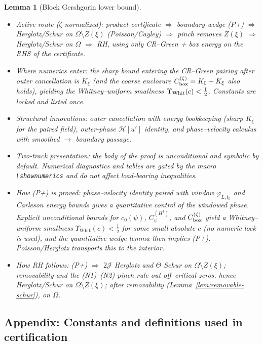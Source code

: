 \documentclass[11pt]{article}
\newcommand{\Hilb}{\mathcal H}
\newtheorem{lemma}{Lemma}[section]
\theoremstyle{definition}
\theoremstyle{remark}
\begin{document}
\begin{lemma}[Block Gershgorin lower bound]
\begin{itemize}
\item Active route ($\zeta$-normalized): product certificate $\Rightarrow$ boundary wedge (P+) $\Rightarrow$ Herglotz/Schur on $\Omega\setminus Z(\xi)$ (Poisson/Cayley) $\Rightarrow$ pinch removes $Z(\xi)$ $\Rightarrow$ Herglotz/Schur on $\Omega$ $\Rightarrow$ RH, using only CR–Green + box energy on the RHS of the certificate.
\item Where numerics enter: the sharp bound entering the CR–Green pairing after outer cancellation is $K_\xi$ (and the coarse enclosure $C_{\rm box}^{(\zeta)}=K_0+K_\xi$ also holds), yielding the Whitney–uniform smallness $\Upsilon_{\rm Whit}(c)<\tfrac12$. Constants are locked and listed once.
\item Structural innovations: outer cancellation with energy bookkeeping (sharp $K_\xi$ for the paired field), outer-phase $\Hilb[u']$ identity, and phase–velocity calculus with smoothed $\to$ boundary passage.
\item Two-track presentation: the body of the proof is unconditional and symbolic by default. Numerical diagnostics and tables are gated by the macro \verb+\shownumerics+ and do not affect load-bearing inequalities.
\item How (P+) is proved: phase–velocity identity paired with window $\varphi_{L,t_0}$ and Carleson energy bounds gives a quantitative control of the windowed phase. Explicit unconditional bounds for $c_0(\psi)$, $C_\psi^{(H^1)}$, and $C_{\rm box}^{(\zeta)}$ yield a Whitney–uniform smallness $\Upsilon_{\mathrm{Whit}}(c)<\tfrac12$ for some small absolute $c$ (no numeric lock is used), and the quantitative wedge lemma then implies (P+). Poisson/Herglotz transports this to the interior.
\item How RH follows: (P+) $\Rightarrow$ $2\mathcal J$ Herglotz and $\Theta$ Schur on $\Omega\setminus Z(\xi)$; removability and the (N1)–(N2) pinch rule out off–critical zeros, hence Herglotz/Schur on $\Omega\setminus Z(\xi)$; after removability (Lemma~\ref{lem:removable-schur}), on $\Omega$.
\end{itemize}







\vspace{1.0cm}
\subsection*{Appendix: Constants and definitions used in certification}


\end{lemma}
\end{document}
